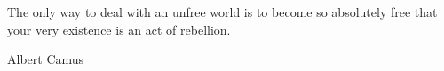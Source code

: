 
The only way to deal with an unfree world is to become so absolutely free that your very existence is an act of rebellion. 

Albert Camus